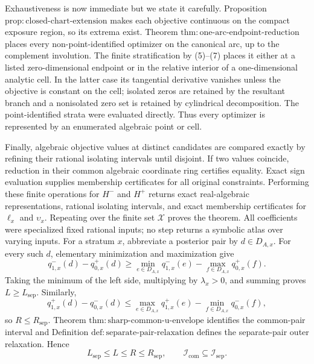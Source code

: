 Exhaustiveness is now immediate but we state it carefully.  Proposition \(\mathrm{prop{:}closed\text{-}chart\text{-}extension}\) makes each objective continuous on the compact exposure region, so its extrema exist.  Theorem \(\mathrm{thm{:}one\text{-}arc\text{-}endpoint\text{-}reduction}\) places every non-point-identified optimizer on the canonical arc, up to the complement involution.  The finite stratification by (5)--(7) places it either at a listed zero-dimensional endpoint or in the relative interior of a one-dimensional analytic cell.  In the latter case its tangential derivative vanishes unless the objective is constant on the cell; isolated zeros are retained by the resultant branch and a nonisolated zero set is retained by cylindrical decomposition.  The point-identified strata were evaluated directly.  Thus every optimizer is represented by an enumerated algebraic point or cell.

Finally, algebraic objective values at distinct candidates are compared exactly by refining their rational isolating intervals until disjoint.  If two values coincide, reduction in their common algebraic coordinate ring certifies equality.  Exact sign evaluation supplies membership certificates for all original constraints.  Performing these finite operations for \(H^-\) and \(H^+\) returns exact real-algebraic representations, rational isolating intervals, and exact membership certificates for \(\ell_x\) and \(\upsilon_x\).  Repeating over the finite set \(\mathcal X\) proves the theorem.  All coefficients were specialized fixed rational inputs; no step returns a symbolic atlas over varying inputs.
For a stratum \(x\), abbreviate a posterior pair by \(d\in D_{A,x}\).  For every such \(d\), elementary minimization and maximization give
\[
 q^-_{1,x}(d)-q^+_{0,x}(d)
 \geq \min_{e\in D_{A,x}}q^-_{1,x}(e)
      -\max_{f\in D_{A,x}}q^+_{0,x}(f).                                \tag{11}
\]
Taking the minimum of the left side, multiplying by \(\lambda_x>0\), and summing proves \(L\geq L_{\mathrm{sep}}\).  Similarly,
\[
 q^+_{1,x}(d)-q^-_{0,x}(d)
 \leq \max_{e\in D_{A,x}}q^+_{1,x}(e)
      -\min_{f\in D_{A,x}}q^-_{0,x}(f),                                \tag{12}
\]
so \(R\leq R_{\mathrm{sep}}\).  Theorem \(\mathrm{thm{:}sharp\text{-}common\text{-}u\text{-}envelope}\) identifies the common-pair interval and Definition \(\mathrm{def{:}separate\text{-}pair\text{-}relaxation}\) defines the separate-pair outer relaxation.  Hence
\[
 L_{\mathrm{sep}}\leq L\leq R\leq R_{\mathrm{sep}},
 \qquad \mathcal I_{\mathrm{com}}\subseteq\mathcal I_{\mathrm{sep}}.  \tag{13}
\]


